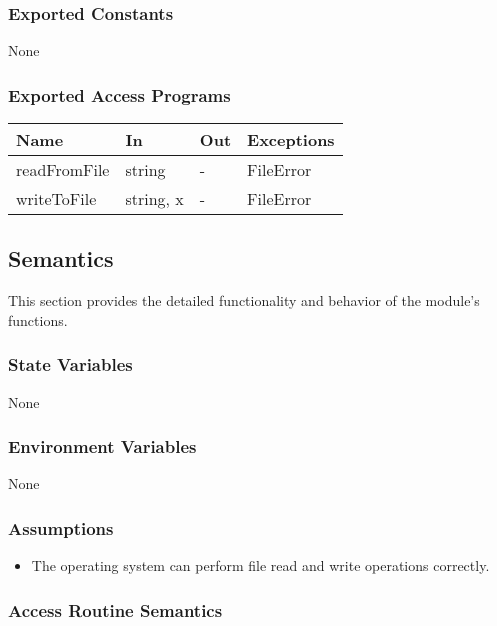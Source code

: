 \documentclass[12pt, titlepage]{article}
\begin{document}
\subsubsection{Exported Constants}

None

\subsubsection{Exported Access Programs}

\begin{center}
\begin{tabular}{p{3cm} p{4cm} p{4cm} p{2cm}}
\hline
\textbf{Name} & \textbf{In} & \textbf{Out} & \textbf{Exceptions} \\
\hline
readFromFile & string & - & FileError \\
writeToFile & string, x & - & FileError \\
\hline
\end{tabular}
\end{center}

\subsection{Semantics}

This section provides the detailed functionality and behavior of the module’s
functions.

\subsubsection{State Variables}

None

\subsubsection{Environment Variables}

None

\subsubsection{Assumptions}

\begin{itemize}
\item The operating system can perform file read and write operations correctly.
\end{itemize}

\subsubsection{Access Routine Semantics}
\end{document}
